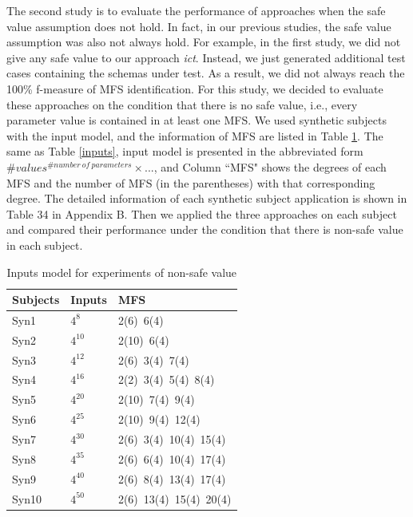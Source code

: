 \documentclass[journal,12pt,onecolumn,draftclsnofoot,]{IEEEtran}
\begin{document}
The second study is to evaluate the performance of approaches when the safe value assumption does not hold. In fact, in our previous studies, the safe value assumption was also not always hold. For example, in the first study, we did not give any safe value to our approach \emph{ict}. Instead, we just generated additional test cases containing the schemas under test. As a result, we did not always reach the 100\% f-measure of MFS identification. For this study, we decided to evaluate these approaches on the condition that there is no safe value, i.e., every parameter value is contained in at least one MFS. We used synthetic subjects with  the input model, and the information of MFS are listed in Table \ref{inputs_non_safe}. The same as Table \ref{inputs}, input model is presented in the abbreviated form $\#values^{\#number\ of\ parameters} \times ...$, and  Column ``MFS" shows the degrees of each MFS and the number of MFS (in the parentheses) with that corresponding degree.  {\color{red}The detailed information of each synthetic subject application is shown in Table 34 in Appendix B.} Then we applied the three approaches on each subject and compared their performance under the condition that there is non-safe value in each subject.

\begin{table}[ht]
\caption{Inputs model for experiments of non-safe value}
\label{inputs_non_safe}
\centering
\begin{tabular}{l|l|l}
\hline
Subjects & Inputs & MFS \\
\hline
Syn1   &  $4^{8}$       & 2(6)\ 6(4)  \\
Syn2   &   $4^{10} $      &  2(10)\ 6(4) \\
Syn3     &   $4^{12} $      &    2(6)\ 3(4)\ 7(4)  \\
Syn4    & $4^{16}$        &  2(2)\ 3(4)\ 5(4)\ 8(4)   \\
Syn5     &  $4^{20}  $ &2(10)\ 7(4)\ 9(4) \\
Syn6   &  $4^{25}$       & 2(10)\ 9(4)\ 12(4)  \\
Syn7   &   $4^{30}$      &  2(6)\ 3(4)\ 10(4)\ 15(4) \\
Syn8     &   $4^{35} $      & 2(6)\ 6(4)\ 10(4)\ 17(4)  \\
Syn9    & $4^{40} $        &   2(6)\ 8(4)\ 13(4)\ 17(4)   \\
Syn10     &  $4^{50} $ &2(6)\ 13(4)\ 15(4)\ 20(4) \\ \hline
\end{tabular}

\end{table}
\end{document}
